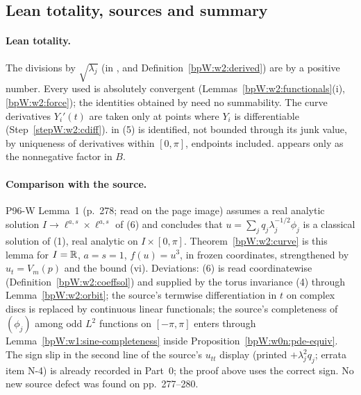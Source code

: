 \subsection{Lean totality, sources and summary}\label{bpW:w2:summary}

\paragraph{Lean totality.} The divisions by $\sqrt{\lambda_j}$ (in ,  and
Definition~\ref{bpW:w2:derived}) are by a positive number. Every  used is absolutely convergent
(Lemmas~\ref{bpW:w2:functionals}(i), \ref{bpW:w2:force}); the identities obtained by  need no
summability. The curve derivatives $Y_i'(t)$ are taken only at points where $Y_i$ is differentiable
(Step~\ref{stepW:w2:cdiff}).  in (5) is identified, not bounded through its junk value, by uniqueness
of derivatives within $[0,\pi]$, endpoints included.  appears only as the nonnegative
factor in $B$.

\paragraph{Comparison with the source.} P96-W Lemma~1 (p.~278; read on the page image) assumes a real analytic
solution $I\to\ell^{a,s}\times\ell^{a,s}$ of (6) and concludes that $u=\sum_jq_j\lambda_j^{-1/2}\phi_j$ is a classical
solution of (1), real analytic on $I\times[0,\pi]$. Theorem~\ref{bpW:w2:curve} is this lemma for $I=\mathbb{R}$, $a=s=1$,
$f(u)=u^3$, in frozen coordinates, strengthened by $u_t=V_m(p)$ and the bound (vi). Deviations: (6) is read
coordinatewise (Definition~\ref{bpW:w2:coeffsol}) and supplied by the torus invariance (4) through
Lemma~\ref{bpW:w2:orbit}; the source's termwise differentiation in $t$ on complex discs is replaced by continuous linear
functionals; the source's completeness of $(\phi_j)$ among odd $L^2$ functions on $[-\pi,\pi]$ enters through
Lemma~\ref{bpW:w1:sine-completeness} inside Proposition~\ref{bpW:w0n:pde-equiv}. The sign slip in the second line of
the source's $u_{tt}$ display (printed $+\lambda_j^2q_j$; errata item N-4) is already recorded in Part~0; the proof
above uses the correct sign. No new source defect was found on pp.~277--280.

